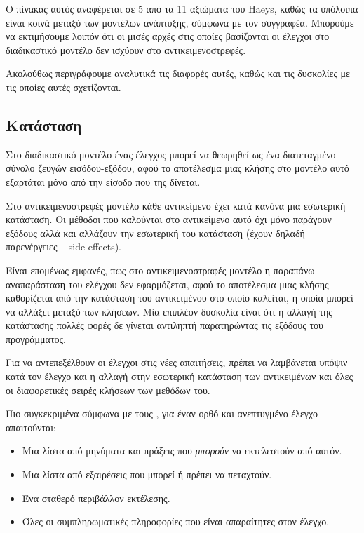 \documentclass[12pt]{article}
\begin{document}
\par Ο πίνακας αυτός αναφέρεται σε 5 από τα 11 αξιώματα του Haeys, καθώς τα υπόλοιπα είναι κοινά μεταξύ των μοντέλων ανάπτυξης, σύμφωνα με τον συγγραφέα. Μπορούμε να εκτιμήσουμε λοιπόν ότι οι μισές αρχές στις οποίες βασίζονται οι έλεγχοι στο διαδικαστικό μοντέλο δεν ισχύουν στο αντικειμενοστρεφές.

\par Ακολούθως περιγράφουμε αναλυτικά τις διαφορές αυτές, καθώς και τις δυσκολίες με τις οποίες αυτές σχετίζονται.

\subsection{Κατάσταση}

Στο διαδικαστικό μοντέλο ένας έλεγχος μπορεί να θεωρηθεί ως ένα διατεταγμένο σύνολο ζευγών εισόδου-εξόδου, αφού το αποτέλεσμα μιας κλήσης στο μοντέλο αυτό εξαρτάται μόνο από την είσοδο που της δίνεται.

\par Στο αντικειμενοστρεφές μοντέλο κάθε αντικείμενο έχει κατά κανόνα μια εσωτερική κατάσταση. Οι μέθοδοι που καλούνται στο αντικείμενο αυτό όχι μόνο παράγουν εξόδους αλλά και αλλάζουν την εσωτερική του κατάσταση (έχουν δηλαδή παρενέργειες – side effects).

\par Είναι επομένως εμφανές, πως στο αντικειμενοστραφές μοντέλο η παραπάνω αναπαράσταση του ελέγχου δεν εφαρμόζεται, αφού το αποτέλεσμα μιας κλήσης καθορίζεται από την κατάσταση του αντικειμένου στο οποίο καλείται, η οποία μπορεί να αλλάξει μεταξύ των κλήσεων. Μία επιπλέον δυσκολία είναι ότι η αλλαγή της κατάστασης πολλές φορές δε γίνεται αντιληπτή παρατηρώντας τις εξόδους του προγράμματος.

\par Για να αντεπεξέλθουν οι έλεγχοι στις νέες απαιτήσεις, πρέπει να λαμβάνεται υπόψιν κατά τον έλεγχο και η αλλαγή στην εσωτερική κατάσταση των αντικειμένων και όλες οι διαφορετικές σειρές κλήσεων των μεθόδων του.

\par Πιο συγκεκριμένα σύμφωνα με τους \textcite{gordon}, για έναν ορθό και ανεπτυγμένο έλεγχο απαιτούνται:

\begin{itemize}
\item Μια λίστα από μηνύματα και πράξεις που \textit{μπορούν} να εκτελεστούν από αυτόν.
\item Μια λίστα από εξαιρέσεις που μπορεί ή πρέπει να πεταχτούν.
\item Ένα σταθερό περιβάλλον εκτέλεσης.
\item Όλες οι συμπληρωματικές πληροφορίες που είναι απαραίτητες στον έλεγχο.
\end{itemize}
\end{document}

